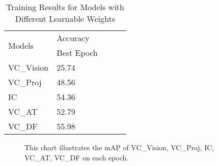 \begin{table}[ht]
    \centering
    \caption{Training Results for Models with Different Learnable Weights}
    \label{tab:ablation_vc}
    \begin{tabular}{lllll}
        \toprule
        \multirow{2}{*}{Models} & Accuracy \\
        \cmidrule{2-2} 
        {} &  Best Epoch \\
        \midrule
        VC\_Vision & 25.74 \\
        VC\_Proj   & 48.56 \\
        IC         & 54.36 \\
        VC\_AT     & 52.79 \\
        VC\_DF     & 55.98 \\
        \bottomrule
    \end{tabular}
\end{table}

\begin{figure}[ht]
    \centering
    \resizebox{1.0\textwidth}{!}{}
    \caption[mAP of VC\_Vision, VC\_Proj, IC, VC\_AT, VC\_DF on each Epoch]{This chart illustrates the mAP of VC\_Vision, VC\_Proj, IC, VC\_AT, VC\_DF on each epoch.}
    \label{fig:ablation_vc}
\end{figure}



